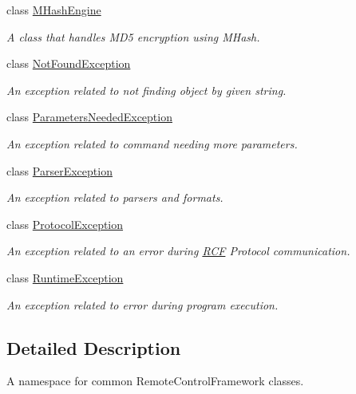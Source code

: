 \begin{DoxyCompactItemize}
class \hyperlink{class_r_c_f_1_1_common_1_1_m_hash_engine}{M\+Hash\+Engine}
\begin{DoxyCompactList}\small\item\em A class that handles M\+D5 encryption using M\+Hash. \end{DoxyCompactList}\item 
class \hyperlink{class_r_c_f_1_1_common_1_1_not_found_exception}{Not\+Found\+Exception}
\begin{DoxyCompactList}\small\item\em An exception related to not finding object by given string. \end{DoxyCompactList}\item 
class \hyperlink{class_r_c_f_1_1_common_1_1_parameters_needed_exception}{Parameters\+Needed\+Exception}
\begin{DoxyCompactList}\small\item\em An exception related to command needing more parameters. \end{DoxyCompactList}\item 
class \hyperlink{class_r_c_f_1_1_common_1_1_parser_exception}{Parser\+Exception}
\begin{DoxyCompactList}\small\item\em An exception related to parsers and formats. \end{DoxyCompactList}\item 
class \hyperlink{class_r_c_f_1_1_common_1_1_protocol_exception}{Protocol\+Exception}
\begin{DoxyCompactList}\small\item\em An exception related to an error during \hyperlink{namespace_r_c_f}{R\+C\+F} Protocol communication. \end{DoxyCompactList}\item 
class \hyperlink{class_r_c_f_1_1_common_1_1_runtime_exception}{Runtime\+Exception}
\begin{DoxyCompactList}\small\item\em An exception related to error during program execution. \end{DoxyCompactList}\end{DoxyCompactItemize}


\subsection{Detailed Description}
A namespace for common Remote\+Control\+Framework classes. 